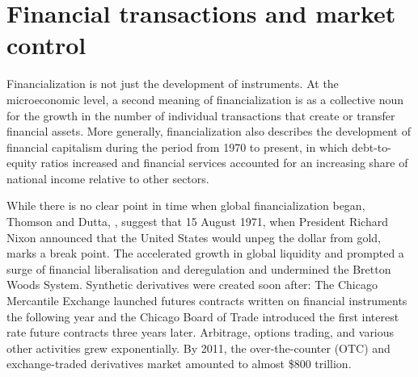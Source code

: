 \section{Financial transactions and market control}

Financialization is not just the development of instruments. 
At the microeconomic level,  a second meaning of financialization is as a collective noun for the growth in the number of individual transactions that create or transfer financial assets. 
More generally, financialization also describes the development of financial capitalism during the period from 1970 to present, in which debt-to-equity ratios increased and financial services accounted for an increasing share of national income relative to other sectors. %

While there is no clear point in time when global financialization began, Thomson and Dutta,  \cite{thomsonFinancialisationPrimer2018}, suggest that 15 August 1971, when President Richard Nixon announced that the United States would unpeg the dollar from gold, marks a break point. The accelerated growth in global liquidity and prompted a surge of financial liberalisation and deregulation and undermined the Bretton Woods System.  Synthetic derivatives were created soon after: The Chicago Mercantile Exchange launched futures contracts written on financial instruments the following year and the Chicago Board of Trade introduced the first interest rate future contracts three years later. Arbitrage, options trading, and various other activities grew exponentially. By 2011, the over-the-counter (OTC) and exchange-traded derivatives market amounted to almost \$800 trillion.  %

